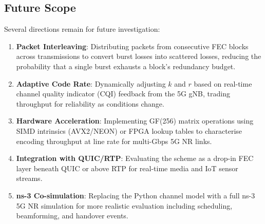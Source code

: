 \documentclass[conference]{IEEEtran}
\begin{document}
\subsection{Future Scope}

Several directions remain for future investigation:
\begin{enumerate}
  \item \textbf{Packet Interleaving}: Distributing packets from
        consecutive FEC blocks across transmissions to convert burst
        losses into scattered losses, reducing the probability that a
        single burst exhausts a block's redundancy budget.
  \item \textbf{Adaptive Code Rate}: Dynamically adjusting $k$ and $r$
        based on real-time channel quality indicator (CQI) feedback from
        the 5G gNB, trading throughput for reliability as conditions
        change.
  \item \textbf{Hardware Acceleration}: Implementing GF(256) matrix
        operations using SIMD intrinsics (AVX2/NEON) or FPGA lookup
        tables to characterise encoding throughput at line rate for
        multi-Gbps 5G NR links.
  \item \textbf{Integration with QUIC/RTP}: Evaluating the scheme as a
        drop-in FEC layer beneath QUIC or above RTP for real-time
        media and IoT sensor streams.
  \item \textbf{ns-3 Co-simulation}: Replacing the Python channel model
        with a full ns-3 5G NR simulation for more realistic evaluation
        including scheduling, beamforming, and handover events.
\end{enumerate}
\end{document}
